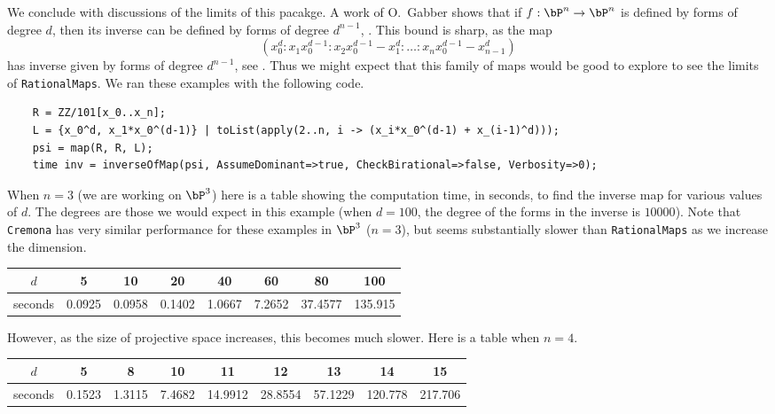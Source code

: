 \documentclass[11pt]{amsart}%
\numberwithin{equation}{theorem}
\renewcommand{\:}{\colon}
\theoremstyle{theorem}
\begin{document}
{{%

We conclude with discussions of the limits of this pacakge.
A work of O.~Gabber shows that if $f : \bP^n \to \bP^n$ is defined by forms of degree $d$, then its inverse can be defined by forms of degree $d^{n-1}$, \cite{BassConnellWrightJacobianConjecture}.  This bound is sharp, as the map
    \[
        (x_0^d : x_1 x_0^{d-1} : x_2 x_0^{d-1} - x_1^d : \dots : x_n x_0^{d-1} - x_{n-1}^d)
    \]
    has inverse given by forms of degree $d^{n-1}$, see \cite{HassanzadehSimisBoundsOnDegreesOfBirat}.  Thus we might expect that this family of maps would be good to explore to see the limits of {\tt RationalMaps}.  We ran these examples with the following code.
}
{\scriptsize
\color{blue}
\begin{verbatim}
    R = ZZ/101[x_0..x_n];
    L = {x_0^d, x_1*x_0^(d-1)} | toList(apply(2..n, i -> (x_i*x_0^(d-1) + x_(i-1)^d)));
    psi = map(R, R, L);
    time inv = inverseOfMap(psi, AssumeDominant=>true, CheckBirational=>false, Verbosity=>0);
\end{verbatim}%
}%
{\color{black}\normalsize
When $n = 3$ (we are working on $\bP^3$) here is a table showing the computation time, in seconds, to find the inverse map for various values of $d$.  The degrees are those we would expect in this example (when $d = 100$, the degree of the forms in the inverse is $10000$).  Note that  {\tt Cremona} has very similar performance for these examples in $\bP^3$ ($n = 3$), but seems substantially slower than {\tt RationalMaps} as we increase the dimension.
\begin{center}
\begin{tabular}{c|c|c|c|c|c|c|c}
  $d$ & 5 & 10 & 20 & 40 & 60 & 80 & 100 \\ \hline
  seconds  &  0.0925 &  0.0958 & 0.1402 &  1.0667 & 7.2652 &  37.4577 & 135.915 \\
\end{tabular}
\end{center}
However, as the size of projective space increases, this becomes much slower.  Here is a table when $n = 4$.
\begin{center}
  \begin{tabular}{c|c|c|c|c|c|c|c|c}
    $d$ & 5 & 8 & 10 & 11 & 12 & 13 & 14 & 15 \\ \hline
    seconds  &  0.1523 & 1.3115 &  7.4682 &  14.9912 &   28.8554 & 57.1229 &   120.778 &  217.706 \\
  \end{tabular}
\end{center}

}}
\end{document}
